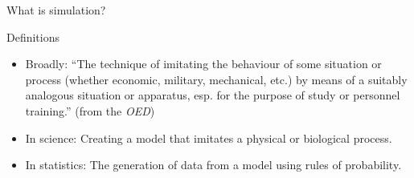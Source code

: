\begin{frame}{What is simulation?}



        \begin{block}{Definitions}
		

		\begin{itemize}

			\item{Broadly: ``The technique of imitating the behaviour of some situation or process (whether economic, military, mechanical, etc.) by means of a suitably analogous situation or apparatus, esp. for the purpose of study or personnel training.'' (from the {\em OED})}

			\item{In science: Creating a model that imitates a physical or biological process.}

        		\item{In statistics: The generation of data from a model using rules of probability.}
                                                
		\end{itemize}

	\end{block}

\end{frame}




